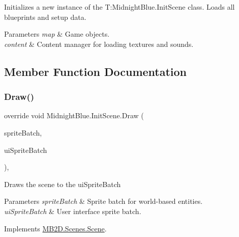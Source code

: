 Initializes a new instance of the T\+:\+Midnight\+Blue.\+Init\+Scene class. Loads all blueprints and setup data. 


\begin{DoxyParams}{Parameters}
{\em map} & Game objects.\\
\hline
{\em content} & Content manager for loading textures and sounds.\\
\hline
\end{DoxyParams}


\subsection{Member Function Documentation}
\hypertarget{class_midnight_blue_1_1_init_scene_a5d6b21ff45a6c14edcf0bd8318133725}{}\label{class_midnight_blue_1_1_init_scene_a5d6b21ff45a6c14edcf0bd8318133725} 
\subsubsection{\texorpdfstring{Draw()}{Draw()}}
{\footnotesize\ttfamily override void Midnight\+Blue.\+Init\+Scene.\+Draw (\begin{DoxyParamCaption}\item[{Sprite\+Batch}]{sprite\+Batch,  }\item[{Sprite\+Batch}]{ui\+Sprite\+Batch }\end{DoxyParamCaption})\hspace{0.3cm}{\ttfamily [inline]}, {\ttfamily [virtual]}}



Draws the scene to the ui\+Sprite\+Batch 


\begin{DoxyParams}{Parameters}
{\em sprite\+Batch} & Sprite batch for world-\/based entities.\\
\hline
{\em ui\+Sprite\+Batch} & User interface sprite batch.\\
\hline
\end{DoxyParams}


Implements \hyperlink{class_m_b2_d_1_1_scenes_1_1_scene_a932d33071ecb4c5187367825dba72324}{M\+B2\+D.\+Scenes.\+Scene}.

\hypertarget{class_midnight_blue_1_1_init_scene_a16fc773b06a711e1ba35dda44e3edc3e}{}\label{class_midnight_blue_1_1_init_scene_a16fc773b06a711e1ba35dda44e3edc3e} 

